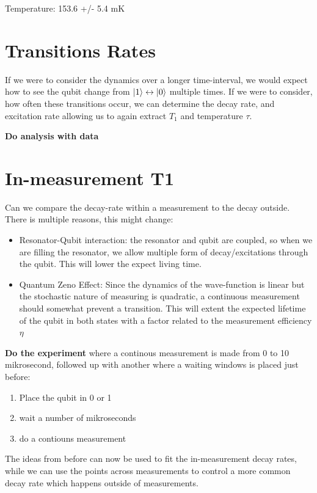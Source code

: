 Temperature: 	 153.6 +/- 5.4 mK


\section{Transitions Rates}
If we were to consider the dynamics over a longer time-interval, we would expect how to see the qubit change from $\ket{1} \leftrightarrow \ket{0}$ multiple times. If we were to consider, how often these transitions occur, we can determine the decay rate, and excitation rate allowing us to again extract $T_1$ and temperature $\tau$.

\textbf{Do analysis with data}



\section{In-measurement T1 }
Can we compare the decay-rate within a measurement to the decay outside. There is multiple reasons, this might change:
\begin{itemize}
    \item Resonator-Qubit interaction: the resonator and qubit are coupled, so when we are filling the resonator, we allow multiple form of decay/excitations through the qubit. This will lower the expect living time.
    \item Quantum Zeno Effect: Since the dynamics of the wave-function is linear but the stochastic nature of measuring is quadratic, a continuous measurement should somewhat prevent a transition. This will extent the expected lifetime of the qubit in both states with a factor related to the measurement efficiency $\eta$
\end{itemize}

\textbf{Do the experiment} where a continous measurement is made from 0 to 10 mikrosecond, followed up with another where a waiting windows is placed just before:
\begin{enumerate}
    \item Place the qubit in 0 or 1
    \item wait a number of mikroseconds
    \item do a contiouns measurement
\end{enumerate}
The ideas from before can now be used to fit the in-measurement decay rates, while we can use the points across measurements to control a more common decay rate which happens outside of measurements.